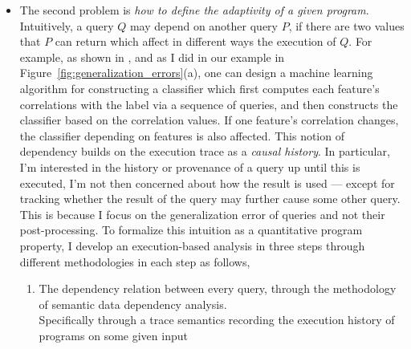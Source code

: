 \begin{itemize}
\item 
The second problem is \emph{how to define the adaptivity of a given program}.
Intuitively, a query $Q$ may depend on another query $P$, if there are two values that $P$ can return which affect in different ways the execution of $Q$. 
For example, as shown in \cite{dwork2015reusable}, and as I did in our example in Figure~\ref{fig:generalization_errors}(a), one can design a machine learning algorithm for constructing a classifier which first computes each feature's correlations with the label via a sequence of queries, and then constructs the classifier based on the correlation values. 
If one feature's correlation changes, the classifier depending on features is also affected.  
This notion of dependency builds on the execution trace as a \emph{causal history}. 
In particular, I'm interested in the history or provenance of a query up until this is executed, I'm not then concerned about how the result is used --- except for tracking whether the result of the query may further cause some other query. 
This is because I focus on the generalization error of queries and not their post-processing. %
To formalize this intuition as a quantitative program property, I develop an execution-based analysis
   in three steps through different methodologies in each step as follows,
   \begin{enumerate}
	\item The dependency relation between every query, through the methodology of semantic data dependency analysis.
    \\
    Specifically through a trace semantics recording the execution history of programs on some given input

\end{enumerate}
\end{itemize}
